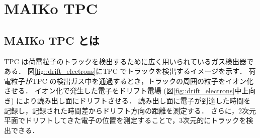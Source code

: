 \documentclass[../master]{subfiles}
\begin{document}
\chapter{MAIKo TPC}
\section{MAIKo TPC とは}
TPC は荷電粒子のトラックを検出するために広く用いられているガス検出器である．
図\ref{fig::drift_electrons}にTPC でトラックを検出するイメージを示す．
荷電粒子がTPC の検出ガス中を通過するとき，トラックの周囲の粒子をイオン化させる．
イオン化で発生した電子をドリフト電場 (図\ref{fig::drift_electrons}中上向き) により読み出し面にドリフトさせる．
読み出し面に電子が到達した時間を記録し，記録された時間差からドリフト方向の距離を測定する．
さらに，2次元平面でドリフトしてきた電子の位置を測定することで，3次元的にトラックを検出できる．
\end{document}
